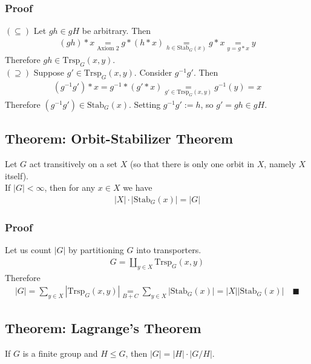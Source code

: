 \documentclass[11pt]{article}
\newcommand{\0}{\emptyset}
\begin{document}
\subsubsection*{Proof}
\label{sec:org477255a}
\((\subseteq)\) Let \(gh\in gH\) be arbitrary. Then\\[0pt]
\begin{align*}
  (gh)*x\underset{\text{Axiom 2}}{=}g*(h*x)\underset{h\in\text{Stab}_{G}(x)}{=}g*x\underset{y=g*x}{=}y
\end{align*}
Therefore \(gh\in\text{Trsp}_{G}(x,y)\).\\[0pt]
\((\supseteq)\) Suppose \(g'\in\text{Trsp}_{G}(x,y)\). Consider \(g^{-1}g'\). Then\\[0pt]
\begin{align*}
  (g^{-1}g')*x=g^{-1}*(g'*x)
  \underset{g'\in\text{Trsp}_{G}(x,y)}{=}g^{-1}(y)
  =x
\end{align*}
Therefore \((g^{-1}g')\in\text{Stab}_{G}(x)\). Setting \(g^{-1}g':=h\), so \(g'=gh\in gH\).\\[0pt]
\subsection*{Theorem: Orbit-Stabilizer Theorem}
\label{sec:org5589f24}
Let \(G\) act transitively on a set \(X\) (so that there is only one orbit in \(X\), namely \(X\) itself).\\[0pt]
If \(|G|<\infty\), then for any \(x\in X\) we have\\[0pt]
\begin{align*}
  |X|\cdot|\text{Stab}_{G}(x)|=|G|
\end{align*}
\subsubsection*{Proof}
\label{sec:org59c562a}
Let us count \(|G|\) by partitioning \(G\) into transporters.\\[0pt]
\begin{align*}
  G=\coprod_{y\in X}\text{Trsp}_{G}(x,y)
\end{align*}
Therefore\\[0pt]
\begin{align*}
  |G|
  =\sum_{y\in X}|\text{Trsp}_{G}(x,y)|
  \underset{B+C}{=}\sum_{y\in X}|\text{Stab}_{G}(x)|
  =|X||\text{Stab}_{G}(x)|\quad\blacksquare
\end{align*}
\subsection*{Theorem: Lagrange's Theorem}
\label{sec:org520e449}
If \(G\) is a finite group and \(H\leq G\), then \(|G|=|H|\cdot|G/H|\).\\[0pt]
\end{document}
